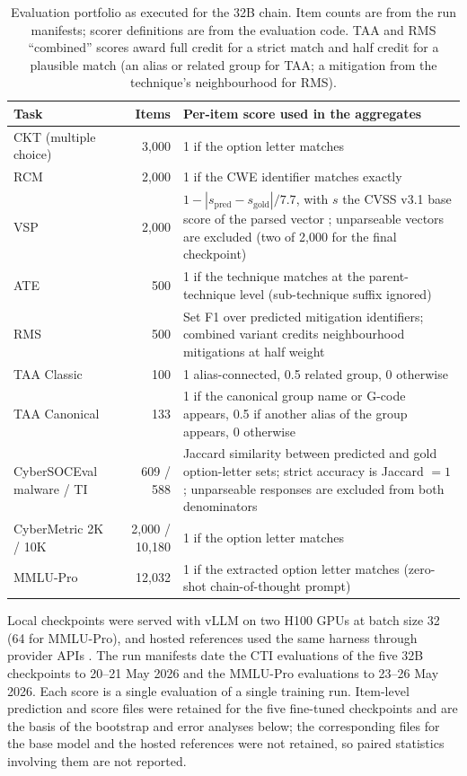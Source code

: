\documentclass[twocolumn]{svjour3}
\begin{document}
\begin{table}
\centering\footnotesize
\caption{Evaluation portfolio as executed for the 32B chain. Item counts are from the run manifests; scorer definitions are from the evaluation code. TAA and RMS ``combined'' scores award full credit for a strict match and half credit for a plausible match (an alias or related group for TAA; a mitigation from the technique's neighbourhood for RMS).}\label{tab:portfolio}
\begin{tabularx}{\textwidth}{@{}lrX@{}}
\toprule Task & Items & Per-item score used in the aggregates \\\midrule
CKT (multiple choice) & 3,000 & 1 if the option letter matches \\
RCM & 2,000 & 1 if the CWE identifier matches exactly \\
VSP & 2,000 & $1-|s_{\text{pred}}-s_{\text{gold}}|/7.7$, with $s$ the CVSS v3.1 base score of the parsed vector \cite{first2019cvss}; unparseable vectors are excluded (two of 2,000 for the final checkpoint) \\
ATE & 500 & 1 if the technique matches at the parent-technique level (sub-technique suffix ignored) \\
RMS & 500 & Set F1 over predicted mitigation identifiers; combined variant credits neighbourhood mitigations at half weight \\
TAA Classic & 100 & 1 alias-connected, 0.5 related group, 0 otherwise \\
TAA Canonical & 133 & 1 if the canonical group name or G-code appears, 0.5 if another alias of the group appears, 0 otherwise \\
CyberSOCEval malware / TI & 609 / 588 & Jaccard similarity between predicted and gold option-letter sets; strict accuracy is Jaccard $=1$; unparseable responses are excluded from both denominators \\
CyberMetric 2K / 10K & 2,000 / 10,180 & 1 if the option letter matches \\
MMLU-Pro & 12,032 & 1 if the extracted option letter matches (zero-shot chain-of-thought prompt) \\\bottomrule
\end{tabularx}
\end{table}

Local checkpoints were served with vLLM \cite{kwon2023vllm} on two H100 GPUs at batch size 32 (64 for MMLU-Pro), and hosted references used the same harness through provider APIs \cite{glaukopis2026software}. The run manifests date the CTI evaluations of the five 32B checkpoints to 20--21 May 2026 and the MMLU-Pro evaluations to 23--26 May 2026. Each score is a single evaluation of a single training run. Item-level prediction and score files were retained for the five fine-tuned checkpoints and are the basis of the bootstrap and error analyses below; the corresponding files for the base model and the hosted references were not retained, so paired statistics involving them are not reported.
\end{document}
